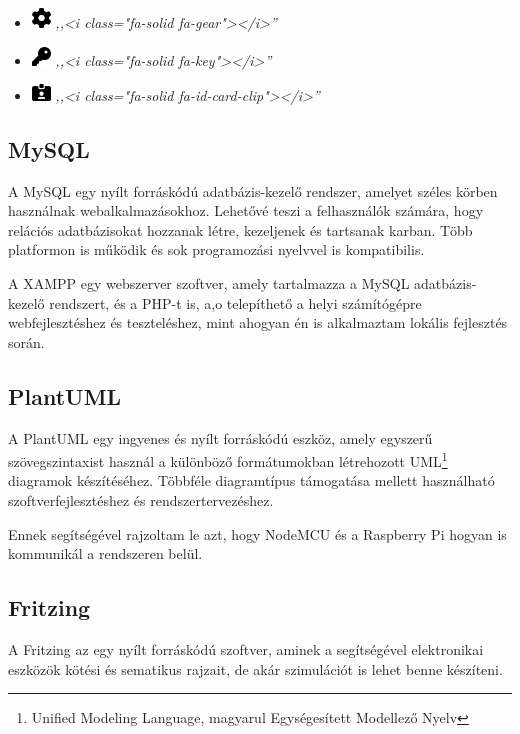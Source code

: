 \documentclass[
]{thesis-ekf}
\theoremstyle{definition}
\theoremstyle{remark}
\begin{document}
\begin{itemize}
		\item \includegraphics[width=0.5cm]{./img/gear-solid}
			\emph{,,<i class="fa-solid fa-gear"></i>''}
			
		\item \includegraphics[width=0.5cm]{./img/key-solid}
			\emph{,,<i class="fa-solid fa-key"></i>''}
			
		\item \includegraphics[width=0.5cm]{./img/id-card-clip-solid}
			\emph{,,<i class="fa-solid fa-id-card-clip"></i>''}
			
	\end{itemize}
	\subsection{MySQL}
	A MySQL egy nyílt forráskódú adatbázis-kezelő rendszer, amelyet széles körben használnak webalkalmazásokhoz. Lehetővé teszi a felhasználók számára, hogy relációs adatbázisokat hozzanak létre, kezeljenek és tartsanak karban. Több platformon is működik és sok programozási nyelvvel is kompatibilis.
	
	A XAMPP egy webszerver szoftver, amely tartalmazza a MySQL adatbázis-kezelő rendszert, és a PHP-t is, a,o telepíthető a helyi számítógépre webfejlesztéshez és teszteléshez, mint ahogyan én is alkalmaztam lokális fejlesztés során.
	\subsection{PlantUML}
	A PlantUML egy ingyenes és nyílt forráskódú eszköz, amely egyszerű szövegszintaxist használ a különböző formátumokban létrehozott UML\footnote{Unified Modeling Language, magyarul Egységesített Modellező Nyelv} diagramok készítéséhez. Többféle diagramtípus támogatása mellett használható szoftverfejlesztéshez és rendszertervezéshez.

	Ennek segítségével rajzoltam le azt, hogy NodeMCU és a Raspberry Pi hogyan is kommunikál a rendszeren belül.
	\subsection{Fritzing}
	A Fritzing az egy nyílt forráskódú szoftver, aminek a segítségével elektronikai eszközök kötési és sematikus rajzait, de akár szimulációt is lehet benne készíteni.
	
\end{document}
